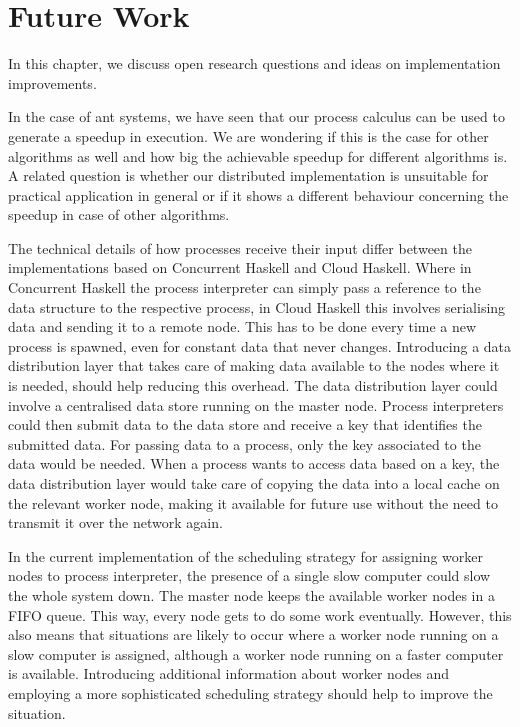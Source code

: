 \chapter{Future Work}
In this chapter, we discuss open research questions and ideas on implementation improvements.

In the case of ant systems, we have seen that our process calculus can be used to generate a speedup in execution. We are wondering if this is the case for other algorithms as well and how big the achievable speedup for different algorithms is. A related question is whether our distributed implementation is unsuitable for practical application in general or if it shows a different behaviour concerning the speedup in case of other algorithms.

The technical details of how processes receive their input differ between the implementations based on \textsf{Concurrent Haskell} and \textsf{Cloud Haskell}. Where in \textsf{Concurrent Haskell} the process interpreter can simply pass a reference to the data structure to the respective process, in \textsf{Cloud Haskell} this involves serialising data and sending it to a remote node. This has to be done every time a new process is spawned, even for constant data that never changes. Introducing a data distribution layer that takes care of making data available to the nodes where it is needed, should help reducing this overhead. The data distribution layer could involve a centralised data store running on the master node. Process interpreters could then submit data to the data store and receive a key that identifies the submitted data. For passing data to a process, only the key associated to the data would be needed. When a process wants to access data based on a key, the data distribution layer would take care of copying the data into a local cache on the relevant worker node, making it available for future use without the need to transmit it over the network again.

In the current implementation of the scheduling strategy for assigning worker nodes to process interpreter, the presence of a single slow computer could slow the whole system down. The master node keeps the available worker nodes in a FIFO queue. This way, every node gets to do some work eventually. However, this also means that situations are likely to occur where a worker node running on a slow computer is assigned, although a worker node running on a faster computer is available. Introducing additional information about worker nodes and employing a more sophisticated scheduling strategy should help to improve the situation.